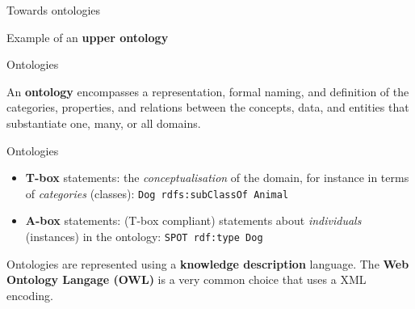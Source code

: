 \documentclass[compress]{beamer}
\newcommand{\stmt}[1]{{\footnotesize \tt  #1}}
\begin{document}
\begin{frame}{Towards ontologies}
{\begin{figure}
{\begin{tikzpicture}
            \end{tikzpicture}
            }
    \end{figure}

    \large
    Example of an \textbf{upper ontology}

    }

\end{frame}


\begin{frame}{Ontologies}


    \centering
    \Large
     An \textbf{ontology} encompasses a representation, formal naming, and definition of the categories,
     properties, and relations between the concepts, data, and entities that
     substantiate one, many, or all domains.

     \normalsize



\end{frame}

\begin{frame}{Ontologies}

    \begin{itemize}
        \item \textbf{T-box} statements: the \emph{conceptualisation} of the
            domain, for instance in terms of \emph{categories} (classes): \stmt{Dog
            rdfs:subClassOf Animal}

        \item \textbf{A-box} statements: (T-box compliant) statements about
            \emph{individuals} (instances) in the ontology: \stmt{SPOT rdf:type Dog}

    \end{itemize}

    \pause

    Ontologies are represented using a \textbf{knowledge description} language.
    The \textbf{Web Ontology Langage (OWL)} is a very common choice that uses a
    XML encoding.
\end{frame}
\end{document}
